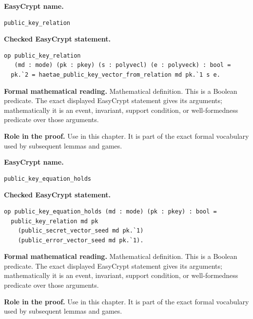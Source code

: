 \begin{formaldefinition}
\noindent\textbf{EasyCrypt name.}
\begin{lstlisting}[language=EasyCrypt,basicstyle=\ttfamily\scriptsize]
public_key_relation
\end{lstlisting}
\noindent\textbf{Checked EasyCrypt statement.}
\begin{lstlisting}[language=EasyCrypt,basicstyle=\ttfamily\scriptsize]
op public_key_relation
   (md : mode) (pk : pkey) (s : polyvecl) (e : polyveck) : bool =
  pk.`2 = haetae_public_key_vector_from_relation md pk.`1 s e.
\end{lstlisting}
\noindent\textbf{Formal mathematical reading.}
Mathematical definition. This is a Boolean predicate.  The exact displayed EasyCrypt statement gives its arguments; mathematically it is an event, invariant, support condition, or well-formedness predicate over those arguments.

\noindent\textbf{Role in the proof.}
Use in this chapter. It is part of the exact formal vocabulary used by subsequent lemmas and games.

\end{formaldefinition}

\begin{formaldefinition}
\noindent\textbf{EasyCrypt name.}
\begin{lstlisting}[language=EasyCrypt,basicstyle=\ttfamily\scriptsize]
public_key_equation_holds
\end{lstlisting}
\noindent\textbf{Checked EasyCrypt statement.}
\begin{lstlisting}[language=EasyCrypt,basicstyle=\ttfamily\scriptsize]
op public_key_equation_holds (md : mode) (pk : pkey) : bool =
  public_key_relation md pk
    (public_secret_vector_seed md pk.`1)
    (public_error_vector_seed md pk.`1).
\end{lstlisting}
\noindent\textbf{Formal mathematical reading.}
Mathematical definition. This is a Boolean predicate.  The exact displayed EasyCrypt statement gives its arguments; mathematically it is an event, invariant, support condition, or well-formedness predicate over those arguments.

\noindent\textbf{Role in the proof.}
Use in this chapter. It is part of the exact formal vocabulary used by subsequent lemmas and games.

\end{formaldefinition}

